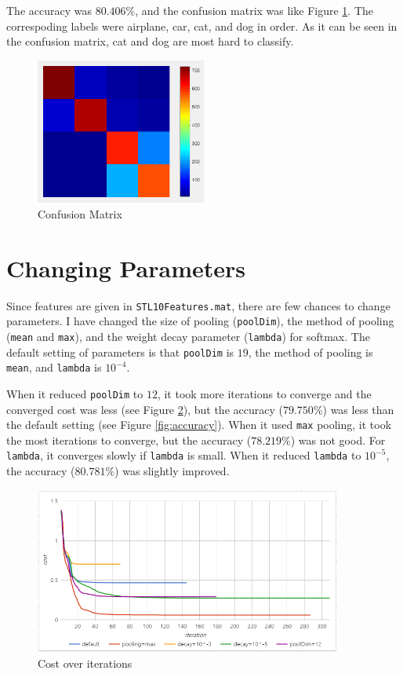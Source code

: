 \documentclass[a4paper,10pt]{article}
\begin{document}
The accuracy was $80.406\%$, and the confusion matrix was like Figure \ref{fig:confusion}.
The correspoding labels were airplane, car, cat, and dog in order.
As it can be seen in the confusion matrix, cat and dog are most hard to classify.
\begin{figure}[h]
\caption{Confusion Matrix}
\label{fig:confusion}
\centering
\includegraphics[width=0.5\textwidth]{confusion}
\end{figure}

\section*{Changing Parameters}

Since features are given in \texttt{STL10Features.mat}, there are few chances to change parameters.
I have changed the size of pooling (\texttt{poolDim}), the method of pooling (\texttt{mean} and \texttt{max}), and the weight decay parameter (\texttt{lambda}) for softmax.
The default setting of parameters is that \texttt{poolDim} is $19$, the method of pooling is \texttt{mean}, and \texttt{lambda} is $10^{-4}$.

When it reduced \texttt{poolDim} to $12$, it took more iterations to converge and the converged cost was less (see Figure \ref{fig:cost}), but the accuracy ($79.750\%$) was less than the default setting (see Figure \ref{fig:accuracy}).
When it used \texttt{max} pooling, it took the most iterations to converge, but the accuracy ($78.219\%$) was not good.
For \texttt{lambda}, it converges slowly if \texttt{lambda} is small.
When it reduced \texttt{lambda} to $10^{-5}$, the accuracy ($80.781\%$) was slightly improved.

\begin{figure}[h]
\caption{Cost over iterations}
\label{fig:cost}
\centering
\includegraphics[width=0.9\textwidth]{cost}
\end{figure}
\end{document}
